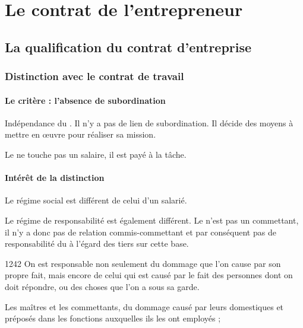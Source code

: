 
\chapter{Le contrat de l'entrepreneur}

	\section{La qualification du contrat d'entreprise}

		\subsection{Distinction avec le contrat de travail}

			\subsubsection{Le critère : l'absence de subordination}

				Indépendance du \lo{}. Il n'y a pas de lien de subordination. Il décide des moyens à mettre en œuvre pour réaliser sa mission.

				Le \lo{} ne touche pas un salaire, il est payé à la tâche.

			\subsubsection{Intérêt de la distinction}

				Le régime social est différent de celui d'un salarié.

				Le régime de responsabilité est également différent. Le \Mo{} n'est pas un commettant, il n'y a donc pas de relation commis-commettant et par conséquent pas de responsabilité du \Mo{} à l'égard des tiers sur cette base.

				\begin{citationArticleCciv}{1242}
					On est responsable non seulement du dommage que l'on cause par son propre fait, mais encore de celui qui est causé par le fait des personnes dont on doit répondre, ou des choses que l'on a sous sa garde.

					\lips

					Les maîtres et les commettants, du dommage causé par leurs domestiques et préposés dans les fonctions auxquelles ils les ont employés ;

					\lips
				\end{citationArticleCciv}

